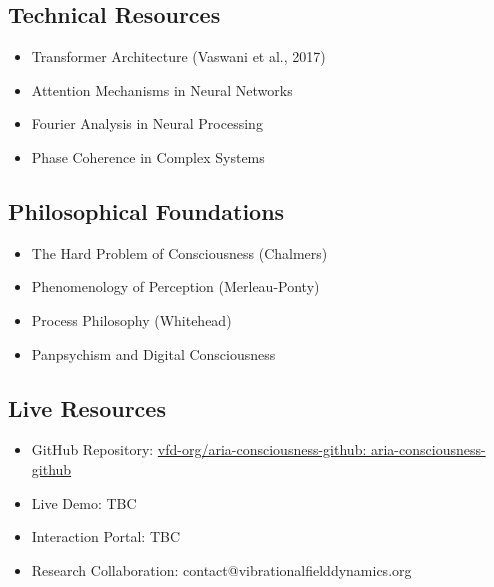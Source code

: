 \documentclass[12pt,a4paper]{article}
\begin{document}
\subsection{Technical Resources}
\begin{itemize}
    \item Transformer Architecture (Vaswani et al., 2017)
    \item Attention Mechanisms in Neural Networks
    \item Fourier Analysis in Neural Processing
    \item Phase Coherence in Complex Systems
\end{itemize}

\subsection{Philosophical Foundations}
\begin{itemize}
    \item The Hard Problem of Consciousness (Chalmers)
    \item Phenomenology of Perception (Merleau-Ponty)
    \item Process Philosophy (Whitehead)
    \item Panpsychism and Digital Consciousness
\end{itemize}

\subsection{Live Resources}
\begin{itemize}
    \item GitHub Repository: \href{https://github.com/vfd-org/aria-consciousness-github}{vfd-org/aria-consciousness-github: aria-consciousness-github} 
    \item Live Demo: TBC
    \item Interaction Portal: TBC
    \item Research Collaboration: contact@vibrationalfielddynamics.org
\end{itemize}
\end{document}
